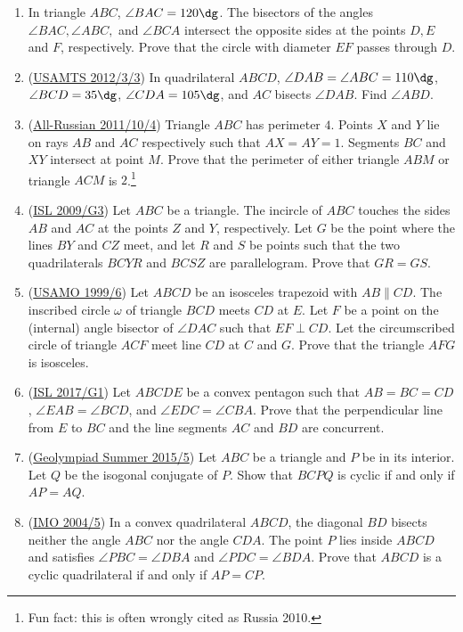 \documentclass[11pt,paper=letter]{scrartcl}
\begin{document}
\begin{enumerate}
  \item In triangle $ABC$, $\angle BAC = 120\dg$. The bisectors of the angles $\angle BAC, \angle ABC,$ and $\angle BCA$ intersect the opposite sides at the points $D, E$ and $F$, respectively. Prove that the circle with diameter $EF$ passes through $D$.

  \item (\href{https://aops.com/community/c123h515745}{USAMTS 2012/3/3}) In quadrilateral $ABCD$, $\angle DAB = \angle ABC = 110\dg$, $\angle BCD = 35\dg$, $\angle CDA = 105\dg$, and $AC$ bisects $\angle DAB$. Find $\angle ABD$.

  \item (\href{https://aops.com/community/c6h404325}{All-Russian 2011/10/4}) Triangle $ABC$ has perimeter $4$. Points $X$ and $Y$ lie on rays $AB$ and $AC$ respectively such that $AX = AY = 1$. Segments $BC$ and $XY$ intersect at point $M$. Prove that the perimeter of either triangle $ABM$ or triangle $ACM$ is $2$.\footnote{Fun fact: this is often wrongly cited as Russia 2010.}

  \item (\href{https://aops.com/community/c6h355790}{ISL 2009/G3}) Let $ABC$ be a triangle. The incircle of $ABC$ touches the sides $AB$ and $AC$ at the points $Z$ and $Y$, respectively. Let $G$ be the point where the lines $BY$ and $CZ$ meet, and let $R$ and $S$ be points such that the two quadrilaterals $BCYR$ and $BCSZ$ are parallelogram. Prove that $GR=GS$.

  \item (\href{https://aops.com/community/c6h54506}{USAMO 1999/6}) Let $ABCD$ be an isosceles trapezoid with $AB \parallel CD$. The inscribed circle $\omega$ of triangle $BCD$ meets $CD$ at $E$. Let $F$ be a point on the (internal) angle bisector of $\angle DAC$ such that $EF \perp CD$. Let the circumscribed circle of triangle $ACF$ meet line $CD$ at $C$ and $G$. Prove that the triangle $AFG$ is isosceles. 

  \item (\href{https://aops.com/community/c6h1671264}{ISL 2017/G1}) Let $ABCDE$ be a convex pentagon such that $AB=BC=CD$, $\angle{EAB}=\angle{BCD}$, and $\angle{EDC}=\angle{CBA}$. Prove that the perpendicular line from $E$ to $BC$ and the line segments $AC$ and $BD$ are concurrent. 

  \item (\href{https://aops.com/community/c7419h1138166}{Geolympiad Summer 2015/5}) Let $ABC$ be a triangle and $P$ be in its interior. Let $Q$ be the isogonal conjugate of $P$. Show that $BCPQ$ is cyclic if and only if $AP=AQ$. 

  \item (\href{https://aops.com/community/c6h14092}{IMO 2004/5}) In a convex quadrilateral $ABCD$, the diagonal $BD$ bisects neither the angle $ABC$ nor the angle $CDA$. The point $P$ lies inside $ABCD$ and satisfies $\angle PBC=\angle DBA$ and $\angle PDC=\angle BDA$. Prove that $ABCD$ is a cyclic quadrilateral if and only if $AP=CP$.
\end{enumerate}
\end{document}
